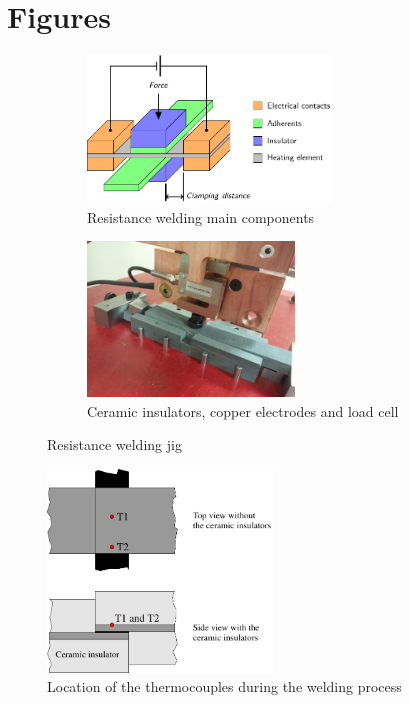\documentclass[11pt,review,times]{elsarticle}
\begin{document}
							\section*{Figures}
\FloatBarrier


\begin{figure}[htb]
	\centering
	\captionsetup{width=125mm}
	\begin{subfigure}{65mm}
		\centering
		\captionsetup{width=65mm}
		\includegraphics[width=65mm]{beamer_IC3_DBrassard-figure1.pdf}
		\caption{Resistance welding main components \cite{Brassard2018_figshare_article1}}
		\label{fig:welding_jig_schematic}
	\end{subfigure}
	\begin{subfigure}{55mm}
		\centering
		\captionsetup{width=55mm}
		\includegraphics[width=55mm]{20161026_152818_resize.jpg}
		\caption{Ceramic insulators, copper electrodes and load cell}
		\label{fig:welding_jig_electrodes}
	\end{subfigure}%
	\caption{Resistance welding jig \cite{Brassard2018_figshare_article1}}
	\label{fig:welding_jig}
\end{figure}

\begin{figure}
		\center
		\captionsetup{width=60mm}
		\includegraphics[width=60mm]{thermocouple_welding}
		\caption{Location of the thermocouples during the welding process \cite{Brassard2018_figshare_article1}}
		\label{fig:location_thermocouple}
\end{figure} 
\end{document}
